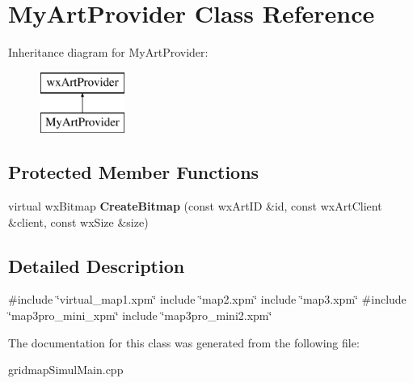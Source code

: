 \hypertarget{classMyArtProvider}{}\section{My\+Art\+Provider Class Reference}
\label{classMyArtProvider}
Inheritance diagram for My\+Art\+Provider\+:\begin{figure}[H]
\begin{center}
\leavevmode
\includegraphics[height=2.000000cm]{classMyArtProvider}
\end{center}
\end{figure}
\subsection*{Protected Member Functions}
\begin{DoxyCompactItemize}
\item 
\mbox{\label{classMyArtProvider_a4f06bcde38b57c560d5d9ec79ebd35dc}} 
virtual wx\+Bitmap {\bfseries Create\+Bitmap} (const wx\+Art\+ID \&id, const wx\+Art\+Client \&client, const wx\+Size \&size)
\end{DoxyCompactItemize}


\subsection{Detailed Description}
\#include \char`\"{}virtual\+\_\+map1.\+xpm\char`\"{} include \char`\"{}map2.\+xpm\char`\"{} include \char`\"{}map3.\+xpm\char`\"{} \#include \char`\"{}map3pro\+\_\+mini\+\_\+xpm\char`\"{} include \char`\"{}map3pro\+\_\+mini2.\+xpm\char`\"{} 

The documentation for this class was generated from the following file\+:\begin{DoxyCompactItemize}
\item 
gridmap\+Simul\+Main.\+cpp\end{DoxyCompactItemize}
